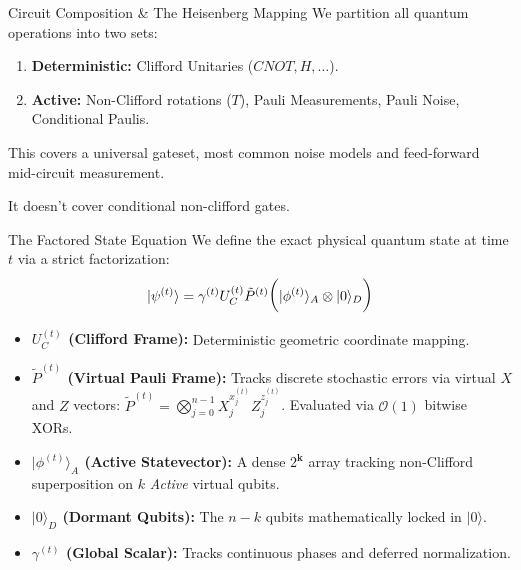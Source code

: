 \documentclass[11pt, aspectratio=169]{beamer}
\begin{document}
\begin{frame}{Circuit Composition \& The Heisenberg Mapping}
  We partition all quantum operations into two sets:
  \begin{enumerate}
      \item \textbf{Deterministic:} Clifford Unitaries ($CNOT, H, \ldots$).
      \item \textbf{Active:} Non-Clifford rotations ($T$), Pauli Measurements, Pauli Noise, Conditional Paulis.
  \end{enumerate}

  \vspace{1em}

  This covers a universal gateset, most common noise models and feed-forward mid-circuit measurement.

  It doesn't cover conditional non-clifford gates.
\end{frame}

\begin{frame}{The Factored State Equation}
  We define the exact physical quantum state at time $t$ via a strict factorization:
  \begin{equation*}
      \Large |\psi^{(t)}\rangle = \gamma^{(t)} U_C^{(t)} \tilde{P}^{(t)} \Big( |\phi^{(t)}\rangle_A \otimes |0\rangle_D \Big)
  \end{equation*}

  \vspace{0.2em}
  \begin{itemize}
      \item \textbf{$U_C^{(t)}$ (Clifford Frame):} Deterministic geometric coordinate mapping.
      \item \textbf{$\tilde{P}^{(t)}$ (Virtual Pauli Frame):} Tracks discrete stochastic errors via virtual $X$ and $Z$ vectors: $\tilde{P}^{(t)} = \bigotimes_{j=0}^{n-1} X_j^{x_j^{(t)}} Z_j^{z_j^{(t)}}$. Evaluated via $\mathcal{O}(1)$ bitwise XORs.
      \item \textbf{$|\phi^{(t)}\rangle_A$ (Active Statevector):} A dense $2^{\mathbf{k}}$ array tracking non-Clifford superposition on $k$ \textit{Active} virtual qubits.
      \item \textbf{$|0\rangle_D$ (Dormant Qubits):} The $n-k$ qubits mathematically locked in $|0\rangle$.
      \item \textbf{$\gamma^{(t)}$ (Global Scalar):} Tracks continuous phases and deferred normalization.
  \end{itemize}
\end{frame}
\end{document}
